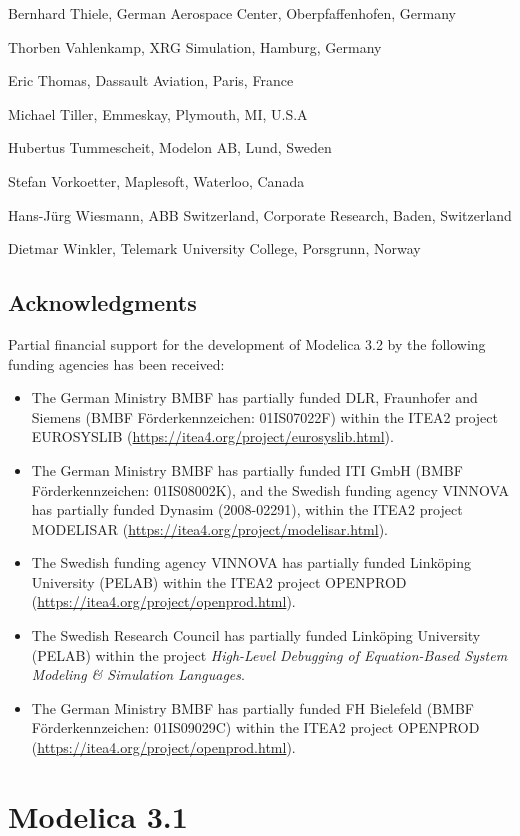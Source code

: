 Bernhard Thiele, German Aerospace Center, Oberpfaffenhofen, Germany

Thorben Vahlenkamp, XRG Simulation, Hamburg, Germany

Eric Thomas, Dassault Aviation, Paris, France

Michael Tiller, Emmeskay, Plymouth, MI, U.S.A

Hubertus Tummescheit, Modelon AB, Lund, Sweden

Stefan Vorkoetter, Maplesoft, Waterloo, Canada

Hans-Jürg Wiesmann, ABB Switzerland, Corporate Research, Baden,
Switzerland

Dietmar Winkler, Telemark University College, Porsgrunn, Norway

\subsection{Acknowledgments}\label{acknowledgments2}

Partial financial support for the development of Modelica 3.2 by the
following funding agencies has been received:
\begin{itemize}
\item
  The German Ministry BMBF has partially funded DLR, Fraunhofer and
  Siemens (BMBF Förderkennzeichen: 01IS07022F) within the ITEA2 project
  EUROSYSLIB (\url{https://itea4.org/project/eurosyslib.html}).
\item
  The German Ministry BMBF has partially funded ITI GmbH (BMBF
  Förderkennzeichen: 01IS08002K), and the Swedish funding agency VINNOVA
  has partially funded Dynasim (2008-02291), within the ITEA2 project
  MODELISAR (\url{https://itea4.org/project/modelisar.html}).
\item
  The Swedish funding agency VINNOVA has partially funded Linköping
  University (PELAB) within the ITEA2 project OPENPROD
  (\url{https://itea4.org/project/openprod.html}).
\item
  The Swedish Research Council has partially funded Linköping University
  (PELAB) within the project \emph{High-Level Debugging of Equation-Based
  System Modeling \& Simulation Languages}.
\item
  The German Ministry BMBF has partially funded FH Bielefeld (BMBF
  Förderkennzeichen: 01IS09029C) within the ITEA2 project OPENPROD
  (\url{https://itea4.org/project/openprod.html}).
\end{itemize}

\section{Modelica 3.1}\label{modelica-3-1}

